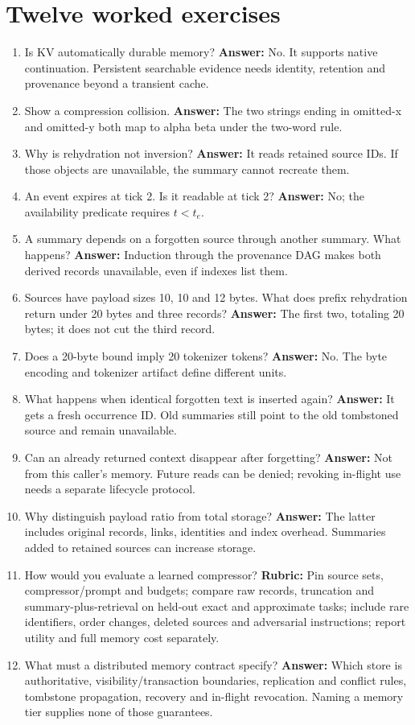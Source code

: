 \section{Twelve worked exercises}
\label{evod40:exercises}
\begin{enumerate}
\item Is KV automatically durable memory? \textbf{Answer:} No. It supports
native continuation. Persistent searchable evidence needs identity, retention
and provenance beyond a transient cache.
\item Show a compression collision. \textbf{Answer:} The two strings ending
in omitted-x and omitted-y both map to alpha beta under the two-word rule.
\item Why is rehydration not inversion? \textbf{Answer:} It reads retained
source IDs. If those objects are unavailable, the summary cannot recreate them.
\item An event expires at tick 2. Is it readable at tick 2?
\textbf{Answer:} No; the availability predicate requires $t<t_e$.
\item A summary depends on a forgotten source through another summary.
What happens? \textbf{Answer:} Induction through the provenance DAG makes
both derived records unavailable, even if indexes list them.
\item Sources have payload sizes 10, 10 and 12 bytes. What does prefix
rehydration return under 20 bytes and three records? \textbf{Answer:} The
first two, totaling 20 bytes; it does not cut the third record.
\item Does a 20-byte bound imply 20 tokenizer tokens? \textbf{Answer:} No.
The byte encoding and tokenizer artifact define different units.
\item What happens when identical forgotten text is inserted again?
\textbf{Answer:} It gets a fresh occurrence ID. Old summaries still point
to the old tombstoned source and remain unavailable.
\item Can an already returned context disappear after forgetting?
\textbf{Answer:} Not from this caller's memory. Future reads can be denied;
revoking in-flight use needs a separate lifecycle protocol.
\item Why distinguish payload ratio from total storage?
\textbf{Answer:} The latter includes original records, links, identities and
index overhead. Summaries added to retained sources can increase storage.
\item How would you evaluate a learned compressor? \textbf{Rubric:} Pin
source sets, compressor/prompt and budgets; compare raw records, truncation
and summary-plus-retrieval on held-out exact and approximate tasks; include
rare identifiers, order changes, deleted sources and adversarial instructions;
report utility and full memory cost separately.
\item What must a distributed memory contract specify?
\textbf{Answer:} Which store is authoritative, visibility/transaction boundaries,
replication and conflict rules, tombstone propagation, recovery and in-flight
revocation. Naming a memory tier supplies none of those guarantees.
\end{enumerate}

